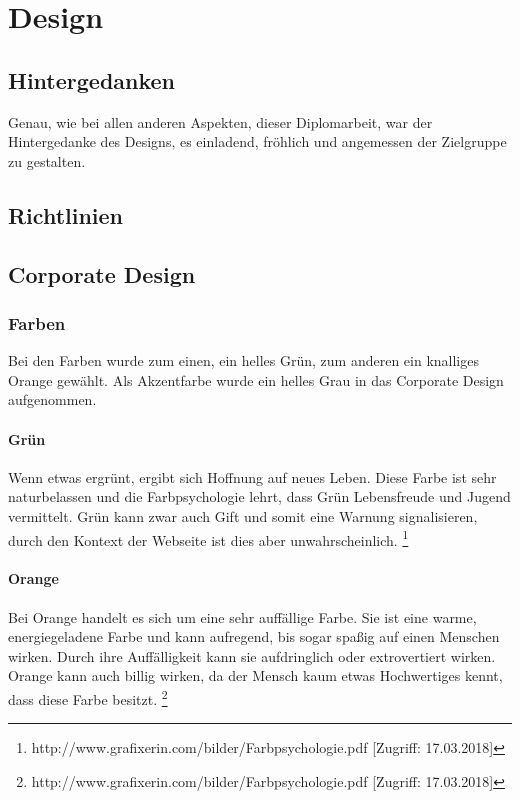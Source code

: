 \chapter{Design}
\renewcommand{\kapitelautor}{Autor: Niklas Kienreich}

\section{Hintergedanken}
Genau, wie bei allen anderen Aspekten, dieser Diplomarbeit, war der Hintergedanke des Designs, es einladend, fröhlich und angemessen der Zielgruppe zu gestalten.

\section{Richtlinien}
\section{Corporate Design}
\subsection{Farben}
Bei den Farben wurde zum einen, ein helles Grün, zum anderen ein knalliges Orange gewählt. Als Akzentfarbe wurde ein helles Grau in das Corporate Design aufgenommen.

\subsubsection{Grün}
Wenn etwas ergrünt, ergibt sich Hoffnung auf neues Leben. Diese Farbe ist sehr naturbelassen und die Farbpsychologie lehrt, dass Grün Lebensfreude und Jugend vermittelt. Grün kann zwar auch Gift und somit eine Warnung signalisieren, durch den Kontext der Webseite ist dies aber unwahrscheinlich. \footnote{\label{foot:1} http://www.grafixerin.com/bilder/Farbpsychologie.pdf [Zugriff: 17.03.2018]}

\subsubsection{Orange}
Bei Orange handelt es sich um eine sehr auffällige Farbe. Sie ist eine warme, energiegeladene Farbe und kann aufregend, bis sogar spaßig auf einen Menschen wirken. Durch ihre Auffälligkeit kann sie aufdringlich oder extrovertiert wirken. Orange kann auch billig wirken, da der Mensch kaum etwas Hochwertiges kennt, dass diese Farbe besitzt. \footnote{\label{foot:1} http://www.grafixerin.com/bilder/Farbpsychologie.pdf [Zugriff: 17.03.2018]}

